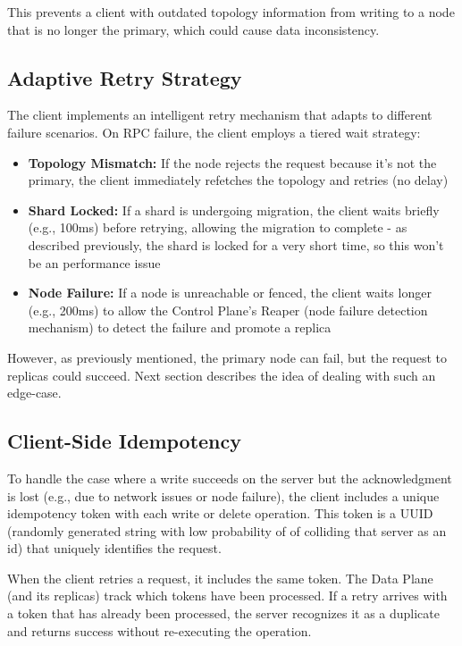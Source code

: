 \documentclass[shortabstract]{iithesis}
\begin{document}
This prevents a client with outdated topology information from writing to a node that is no longer the primary, which could cause data inconsistency.

\subsection{Adaptive Retry Strategy}

The client implements an intelligent retry mechanism that adapts to different failure scenarios. On RPC failure, the client employs a tiered wait strategy:
\begin{itemize}
    \item \textbf{Topology Mismatch:} If the node rejects the request because it's not the primary, the client immediately refetches the topology and retries (no delay)
    \item \textbf{Shard Locked:} If a shard is undergoing migration, the client waits briefly (e.g., 100ms) before retrying, allowing the migration to complete - as described previously, the shard is locked for a very short time, so this won't be an performance issue
    \item \textbf{Node Failure:} If a node is unreachable or fenced, the client waits longer (e.g., 200ms) to allow the Control Plane's Reaper (node failure detection mechanism) to detect the failure and promote a replica
\end{itemize}

However, as previously mentioned, the primary node can fail, but the request to replicas could succeed. Next section describes the idea of dealing with such an edge-case.

\subsection{Client-Side Idempotency}

To handle the case where a write succeeds on the server but the acknowledgment is lost (e.g., due to network issues or node failure), the client includes a unique idempotency token with each write or delete operation. This token is a UUID (randomly generated string with low probability of of colliding that server as an id) that uniquely identifies the request.

When the client retries a request, it includes the same token. The Data Plane (and its replicas) track which tokens have been processed. If a retry arrives with a token that has already been processed, the server recognizes it as a duplicate and returns success without re-executing the operation.
\end{document}
